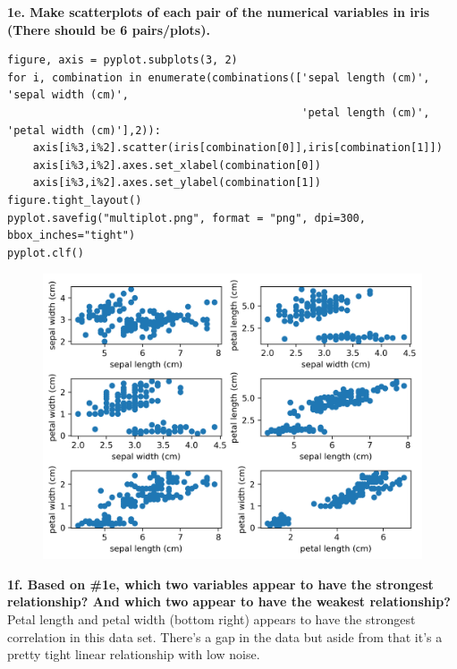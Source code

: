 \documentclass[preview, margin=0.5in]{standalone}
\begin{document}
\textbf{1e. Make scatterplots of each pair of the numerical variables in iris (There should be 6 pairs/plots).}
\begin{verbatim}
figure, axis = pyplot.subplots(3, 2)
for i, combination in enumerate(combinations(['sepal length (cm)', 'sepal width (cm)', 
                                              'petal length (cm)', 'petal width (cm)'],2)):
    axis[i%3,i%2].scatter(iris[combination[0]],iris[combination[1]])
    axis[i%3,i%2].axes.set_xlabel(combination[0])
    axis[i%3,i%2].axes.set_ylabel(combination[1])
figure.tight_layout()
pyplot.savefig("multiplot.png", format = "png", dpi=300, bbox_inches="tight")
pyplot.clf()
\end{verbatim}
\begin{figure}
    \includegraphics[]{multiplot.png}
\end{figure}
\textbf{1f. Based on \#1e, which two variables appear to have the strongest relationship? And which two appear to have the weakest relationship?}
Petal length and petal width (bottom right) appears to have the strongest correlation in this data set. There's a gap in the data but aside from that it's a pretty tight linear relationship with low noise.
\end{document}
